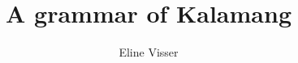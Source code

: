 \author{Eline Visser}
\title{A grammar of Kalamang}
\subtitle{}
\renewcommand{\lsSeries}{cogl}
\renewcommand{\lsSeriesNumber}{ }
